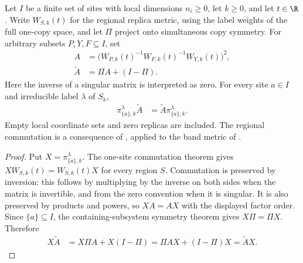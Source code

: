 \begin{theorem}
    \label{thm:singleton_label_band_metric_commutation}
    \leanok
    Let $I$ be a finite set of sites with local dimensions $n_i\ge0$, let
    $k\ge0$, and let $t\in\R$. Write $W_{S,k}(t)$ for the regional replica
    metric, using the label weights of the full one-copy space, and let
    $\Pi$ project onto simultaneous copy symmetry. For arbitrary subsets
    $P,Y,F\subseteq I$, set
    \begin{align*}
        A            & =\bigl(W_{P,k}(t)^{-1}W_{F,k}(t)^{-1}W_{Y,k}(t)\bigr)^2, \\
        \widetilde A & =\Pi A+(I-\Pi).
    \end{align*}
    Here the inverse of a singular matrix is interpreted as zero.
    For every site $a\in I$ and irreducible label $\lambda$ of $S_k$,
    \begin{align*}
        \pi^\lambda_{\{a\},k}\widetilde A
         & =\widetilde A\pi^\lambda_{\{a\},k}.
    \end{align*}
    Empty local coordinate sets and zero replicas are included. The
    regional commutation is a consequence of
    \cite[Lemma~6.1(2)]{OpenAI2026AreaLaw}, applied to the band metric
    of \cite[Proposition~7.4]{OpenAI2026AreaLaw}.
\end{theorem}

\begin{proof}
    \leanok
    Put $X=\pi^\lambda_{\{a\},k}$. The one-site commutation theorem gives
    $XW_{S,k}(t)=W_{S,k}(t)X$ for every region $S$. Commutation is preserved
    by inversion: this follows by multiplying by the inverse on both
    sides when the matrix is invertible, and from the zero convention
    when it is singular. It is also preserved by products and powers,
    so $XA=AX$ with the displayed factor order. Since $\{a\}\subseteq I$,
    the containing-subsystem symmetry theorem gives $X\Pi=\Pi X$.
    Therefore
    \begin{align*}
        X\widetilde A
         & =X\Pi A+X(I-\Pi)
        =\Pi AX+(I-\Pi)X
        =\widetilde A X.
    \end{align*}
\end{proof}

